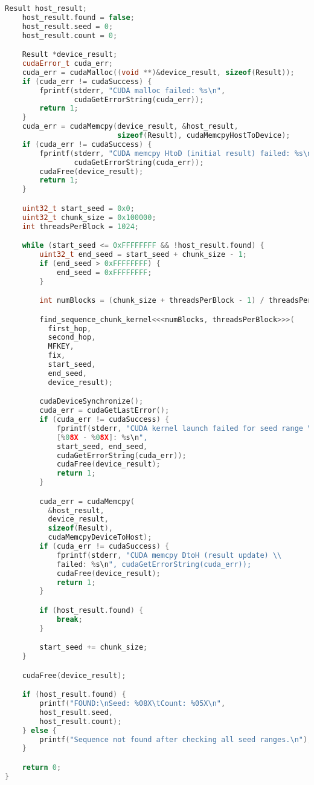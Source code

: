 \begin{lstlisting}[language=C++,showstringspaces=false]
    Result host_result;
    host_result.found = false;
    host_result.seed = 0;
    host_result.count = 0;

    Result *device_result;
    cudaError_t cuda_err;
    cuda_err = cudaMalloc((void **)&device_result, sizeof(Result));
    if (cuda_err != cudaSuccess) {
        fprintf(stderr, "CUDA malloc failed: %s\n",
                cudaGetErrorString(cuda_err));
        return 1;
    }
    cuda_err = cudaMemcpy(device_result, &host_result,
                          sizeof(Result), cudaMemcpyHostToDevice);
    if (cuda_err != cudaSuccess) {
        fprintf(stderr, "CUDA memcpy HtoD (initial result) failed: %s\n",
                cudaGetErrorString(cuda_err));
        cudaFree(device_result);
        return 1;
    }

    uint32_t start_seed = 0x0;
    uint32_t chunk_size = 0x100000;
    int threadsPerBlock = 1024;

    while (start_seed <= 0xFFFFFFFF && !host_result.found) {
        uint32_t end_seed = start_seed + chunk_size - 1;
        if (end_seed > 0xFFFFFFFF) {
            end_seed = 0xFFFFFFFF;
        }

        int numBlocks = (chunk_size + threadsPerBlock - 1) / threadsPerBlock;

        find_sequence_chunk_kernel<<<numBlocks, threadsPerBlock>>>(
          first_hop,
          second_hop,
          MFKEY,
          fix,
          start_seed,
          end_seed,
          device_result);

        cudaDeviceSynchronize();
        cuda_err = cudaGetLastError();
        if (cuda_err != cudaSuccess) {
            fprintf(stderr, "CUDA kernel launch failed for seed range \\
            [%08X - %08X]: %s\n",
            start_seed, end_seed,
            cudaGetErrorString(cuda_err));
            cudaFree(device_result);
            return 1;
        }

        cuda_err = cudaMemcpy(
          &host_result,
          device_result,
          sizeof(Result),
          cudaMemcpyDeviceToHost);
        if (cuda_err != cudaSuccess) {
            fprintf(stderr, "CUDA memcpy DtoH (result update) \\
            failed: %s\n", cudaGetErrorString(cuda_err));
            cudaFree(device_result);
            return 1;
        }

        if (host_result.found) {
            break;
        }

        start_seed += chunk_size;
    }

    cudaFree(device_result);

    if (host_result.found) {
        printf("FOUND:\nSeed: %08X\tCount: %05X\n",
        host_result.seed,
        host_result.count);
    } else {
        printf("Sequence not found after checking all seed ranges.\n");
    }

    return 0;
}
\end{lstlisting}
